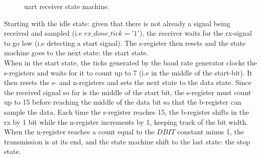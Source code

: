 \documentclass[main.tex]{subfiles}
\begin{document}
\begin{figure}[!htp]
\begin{center}
\caption{\gls{uart} receiver state machine.}
\label{fig:uartrx}
\end{center}
\end{figure}

Starting with the idle state: given that there is not already a signal being received and sampled (i.e $rx\_done\_tick = '1'$), the receiver waits for the rx-signal to go low (i.e detecting a start signal). The s-register then resets and the state machine goes to the next state: the start state. \\

When in the start state, the ticks generated by the baud rate generator clocks the s-registers and waits for it to count up to 7 (i.e in the middle of the start-bit). It then resets the s- and n-registers and sets the next state to the data state. Since the received signal so far is the middle of the start bit, the s-register must count up to 15  before reaching the middle of the data bit so that the b-register can sample the data. Each time the s-register reaches 15, the b-register shifts in the rx by 1 bit while the n-register increments by 1, keeping track of the bit width. When the n-register reaches a count equal to the $DBIT$ constant minus 1, the transmission is at its end, and the state machine shift to the last state: the stop state. \\
\end{document}
